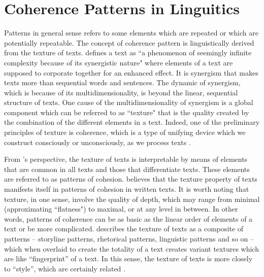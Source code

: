 

\section{Coherence Patterns in Linguitics}
\label{sec:coherence_patterns_in_linguitics}
%
Patterns in general sense refers to some elements which are repeated or which are potentially repeatable.
The concept of coherence pattern is linguistically derived from the texture of texts. 
 defines a text as ``a phenomenon of seemingly infinite complexity because of its synergistic nature" where elements of a text are supposed to corporate together for an enhanced effect. 
It is synergism that makes texts more than sequential words and sentences. 
The dynamic of synergism, which is because of its multidimensionality, is beyond the linear, sequential structure of texts. 
One cause of the multidimensionality of synergism is a global component which can be referred to as ``texture" that is 
the quality created by the combination of the different elements in a text. 
Indeed, one of the preliminary principles of texture is coherence, which is a type of unifying device which we construct consciously or unconsciously, as we process texts \cite{stoddard91,halliday76}.


From 's perspective, the texture of texts is interpretable by means of elements that are common in all texts and those that differentiate texts. 
These elements are referred to as patterns of cohesion. 
 believes that the texture property of texts manifests itself in patterns of cohesion in written texts. 
It is worth noting that texture, in one sense, involve the quality of depth, which may range from minimal (approximating ``flatness") to maximal, or at any level in between. 
In other words, patterns of coherence can be as basic as the linear order of elements of a text or be more complicated. 
 describes the texture of texts as a composite of patterns -- storyline patterns, rhetorical patterns, linguistic patterns and so on -- which when overlaid to create the totality of a text creates variant textures which are like ``fingerprint'' of a text. 
In this sense, the texture of texts is more closely to ``style'', which are certainly related \cite{sedelow66,stoddard91}. 


